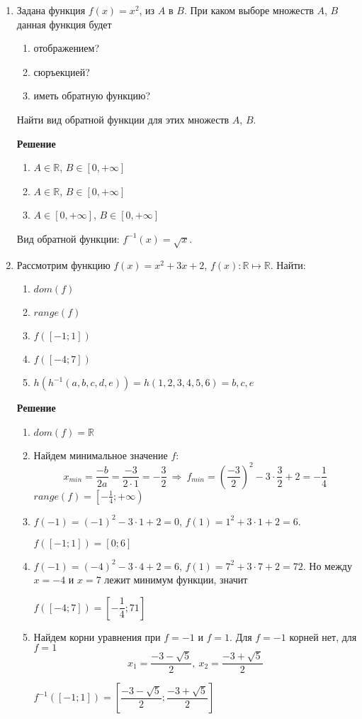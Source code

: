 \documentclass[12pt]{article}
\begin{document}
\begin{enumerate}[label={\textbf{\arabic{section}.\arabic*}}]
	\item Задана функция $f(x) = x^2$, из $A$ в $B$. При каком выборе множеств $A$, $B$ данная функция будет 
	\begin{enumerate}[label=\textbf{\alph*)}]
		\item отображением?
		\item сюръекцией?
		\item иметь обратную функцию?
	\end{enumerate}
	Найти вид обратной функции для этих множеств $A$, $B$.
	
	\textbf{Решение}
	
	\begin{enumerate}[label=\textbf{\alph*)}]
		\item $A\in \mathbb{R}$, $B\in[0,+\infty]$
		\item $A\in \mathbb{R}$, $B\in[0,+\infty]$
		\item $A\in[0,+\infty]$, $B\in[0,+\infty]$
	\end{enumerate}
	Вид обратной функции: $f^{-1}(x) = \sqrt{x}$.
	
	\item  Рассмотрим функцию $f(x) = x^2 + 3x + 2$, $f(x): \mathbb{R}\mapsto\mathbb{R}$. Найти:

	\begin{enumerate}[label=\textbf{\alph*)}]
		\item $dom(f)$
		\item $range(f)$
		\item $f([-1;1])$
		\item $f([-4;7])$
		\item $h(h^{-1}({a,b,c,d,e})) = h({1,2,3,4,5,6}) = {b,c,e}$
	\end{enumerate}
	
	\textbf{Решение}
	
	\begin{enumerate}[label=\textbf{\alph*)}]
		\item $dom(f) = \mathbb{R}$
		\item Найдем минимальное значение $f$: 
		$$
		x_{min} = \frac{-b}{2a} = \frac{-3}{2\cdot1} = -\frac{3}{2}~\Rightarrow~f_{min} = \left(\frac{-3}{2}\right)^2 - 3\cdot\frac{3}{2} + 2 = -\frac{1}{4}
		$$
		$range(f) = \left[-\frac{1}{4}; +\infty\right)$
		\item $f(-1) = (-1)^2 - 3\cdot1 + 2 = 0$, $f(1) = 1^2 + 3\cdot1 + 2 = 6$.
		
		$f([-1;1]) = [0; 6]$
		\item $f(-1) = (-4)^2 - 3\cdot4 + 2 = 6$, $f(1) = 7^2 + 3\cdot7 + 2 = 72$. Но между $x=-4$ и $x=7$ лежит минимум функции, значит
		
		$f([-4;7]) = \left[-\dfrac{1}{4}; 71\right]$
		\item Найдем корни уравнения при $f=-1$ и $f=1$. Для $f=-1$ корней нет, для $f=1$
		$$
		x_1 = \frac{-3-\sqrt{5}}{2},~x_2 = \frac{-3+\sqrt{5}}{2}
		$$
		
		$f^{-1}([-1;1]) = \left[\dfrac{-3-\sqrt{5}}{2};\dfrac{-3+\sqrt{5}}{2}\right]$
	\end{enumerate}
	\end{enumerate}
\end{document}
